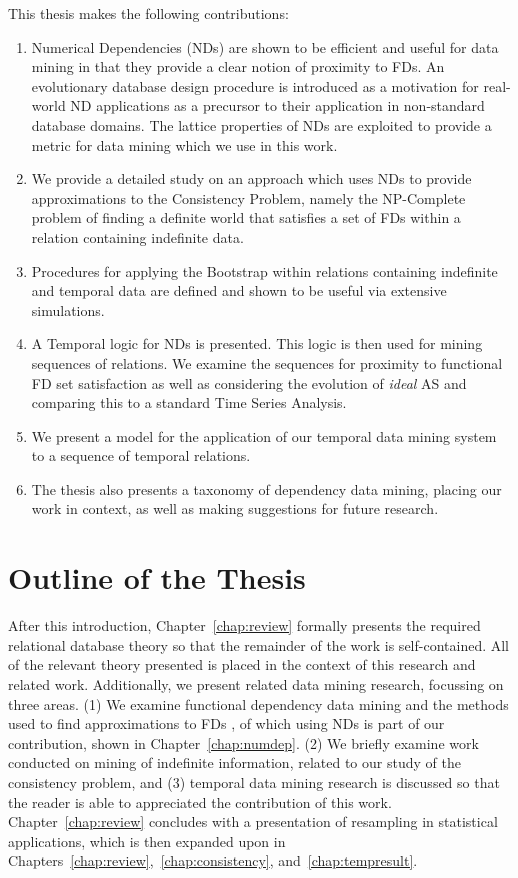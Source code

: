 This thesis makes the following contributions:
\begin{enumerate}
\item Numerical Dependencies (NDs) are shown to be efficient and useful for 
data mining in that they provide a clear notion of proximity to FDs.
An evolutionary database design procedure is introduced as a 
motivation for real-world ND applications as a precursor to their application
in non-standard database domains. The lattice properties of NDs are
exploited to provide a metric for data mining which we use in this
work. 
\item We provide a detailed study on an approach which uses NDs to
provide approximations to the Consistency Problem, namely the
NP-Complete problem of finding a definite world that satisfies a set
of FDs within a relation containing indefinite data. 
\item Procedures for applying the Bootstrap within relations containing
indefinite and temporal data are defined and shown to be useful via extensive
simulations.
\item A Temporal logic for NDs is presented. This logic is then used
for mining sequences of relations. We examine the sequences for proximity
to functional FD set satisfaction as well as considering the evolution
of {\em ideal} AS and comparing this to a standard Time Series
Analysis.
\item We present a model for the application of our temporal data
mining system to a sequence of temporal relations.
\item The thesis also presents a taxonomy of dependency data mining, 
placing our work in context, as well as making suggestions for future research.
\end{enumerate}




\section{Outline of the Thesis}

After this introduction, Chapter~\ref{chap:review} formally presents
the required relational database theory so that the remainder of the
work is self-contained.  All of the relevant theory presented is
placed in the context of this research and related work. Additionally,
we present related data mining research, focussing on three areas. (1)
We examine functional dependency data mining and the methods used to
find approximations to FDs \cite{km95,at94,Mann92,sf93,HS95,pk95,bel95b,psm93}, of which using NDs is part of our
contribution, shown in Chapter~\ref{chap:numdep}. (2) We briefly examine work conducted on mining of
indefinite information, related to our study of the consistency
problem, and (3) temporal data mining research is discussed so that
the reader is able to appreciated the contribution of this
work. Chapter~\ref{chap:review} concludes with a presentation of
resampling in statistical applications, which is then expanded upon in
Chapters~\ref{chap:review},~\ref{chap:consistency},
and~\ref{chap:tempresult}.

